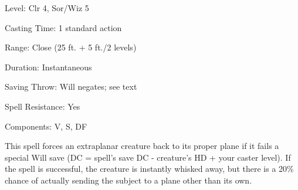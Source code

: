 
\begin{description*}
\item[Level:] Clr 4, Sor/Wiz 5
\item[Casting Time:] 1 standard action
\item[Range:] Close (25 ft. + 5 ft./2 levels)
\item[Duration:] Instantaneous
\item[Saving Throw:] Will negates; see text
\item[Spell Resistance:] Yes
\item[Components:] V, S, DF
\end{description*}

This spell forces an extraplanar creature back to its proper plane if it fails
a special Will save (DC = spell's save DC - creature's HD + your caster level).
If the spell is successful, the creature is instantly whisked away, but there is
a 20\% chance of actually sending the subject to a plane other than its own.